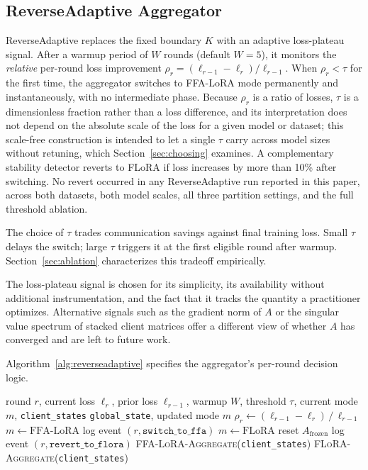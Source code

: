 \documentclass[iicol,pdflatex,sn-mathphys-num]{sn-jnl}
\begin{document}
\subsection{ReverseAdaptive Aggregator}
ReverseAdaptive replaces the fixed boundary $K$ with an adaptive loss-plateau signal. After a warmup period of $W$ rounds (default $W{=}5$), it monitors the \emph{relative} per-round loss improvement $\rho_r = (\ell_{r-1} - \ell_r) / \ell_{r-1}$. When $\rho_r < \tau$ for the first time, the aggregator switches to FFA-LoRA \cite{sun2024ffalora} mode permanently and instantaneously, with no intermediate phase. Because $\rho_r$ is a ratio of losses, $\tau$ is a dimensionless fraction rather than a loss difference, and its interpretation does not depend on the absolute scale of the loss for a given model or dataset; this scale-free construction is intended to let a single $\tau$ carry across model sizes without retuning, which Section~\ref{sec:choosing} examines. A complementary stability detector reverts to FLoRA if loss increases by more than 10\% after switching. No revert occurred in any ReverseAdaptive run reported in this paper, across both datasets, both model scales, all three partition settings, and the full threshold ablation.

The choice of $\tau$ trades communication savings against final training loss. Small $\tau$ delays the switch; large $\tau$ triggers it at the first eligible round after warmup. Section~\ref{sec:ablation} characterizes this tradeoff empirically.

The loss-plateau signal is chosen for its simplicity, its availability without additional instrumentation, and the fact that it tracks the quantity a practitioner optimizes. Alternative signals such as the gradient norm of $A$ or the singular value spectrum of stacked client matrices offer a different view of whether $A$ has converged and are left to future work.

Algorithm~\ref{alg:reverseadaptive} specifies the aggregator's per-round decision logic.

\begin{algorithm}[t]
\centering
\caption{ReverseAdaptive aggregator (per round)}
\label{alg:reverseadaptive}
\footnotesize
\begin{algorithmic}[1]
\Require round $r$, current loss $\ell_r$, prior loss $\ell_{r-1}$,
         warmup $W$, threshold $\tau$, current mode $m$, \texttt{client\_states}
\Ensure \texttt{global\_state}, updated mode $m$
\State $\rho_r \leftarrow (\ell_{r-1} - \ell_r) \,/\, \ell_{r-1}$ 
    \State $m \leftarrow \text{FFA-LoRA}$
    \State log event $(r, \texttt{switch\_to\_ffa})$
 
    \State $m \leftarrow \text{FLoRA}$
    \State reset $A_{\text{frozen}}$
    \State log event $(r, \texttt{revert\_to\_flora})$
\EndIf
{}
    \State \Return \textsc{FFA-LoRA-Aggregate}(\texttt{client\_states})
\Else
    \State \Return \textsc{FLoRA-Aggregate}(\texttt{client\_states})
\EndIf
\end{algorithmic}
\end{algorithm}
\end{document}
